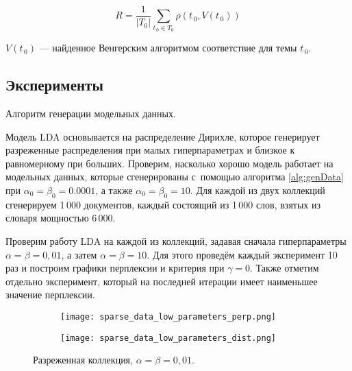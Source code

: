 \documentclass[12pt]{article}
\begin{document}
\[
R = \frac1{|T_0|} \sum_{t_{\,0}\in T_0} \rho(t_{\,0},V(t_{\,0}))
\]

$\displaystyle V(t_{\,0}) $ --- найденное Венгерским алгоритмом соответствие для темы $ t_{\,0} $.

\subsection{Эксперименты}

\begin{algorithm}
\label{alg:genData}
\caption{Алгоритм генерации модельных данных.}
\DontPrintSemicolon


\end{algorithm}

Модель LDA основывается на распределение Дирихле, которое генерирует разреженные распределения при малых гиперпараметрах и близкое к равномерному при больших.
Проверим, насколько хорошо модель работает на модельных данных, которые сгенерированы с~помощью алгоритма \ref{alg:genData} при $ \alpha_0 = \beta_0 = 0.0001 $, а также $ \alpha_0 = \beta_0 = 10 $.
Для каждой из двух коллекций сгенерируем 1\,000 документов, каждый состоящий из 1\,000 слов, взятых из словаря мощностью 6\,000.

Проверим работу LDA на каждой из коллекций, задавая сначала гиперпараметры $ \alpha = \beta = 0,01 $, а затем $ \alpha = \beta = 10 $.
Для этого проведём каждый эксперимент 10 раз и построим графики перплексии и критерия при $ \gamma = 0 $.
Также отметим отдельно эксперимент, который на последней итерации имеет наименьшее значение перплексии.

\begin{figure}[hbtp]
  \centering
  \begin{subfigure}[b]{0.49\textwidth}
    \centering
    \texttt{[image: sparse\_data\_low\_parameters\_perp.png]}
  \end{subfigure}
  \begin{subfigure}[b]{0.49\textwidth}
    \centering
    \texttt{[image: sparse\_data\_low\_parameters\_dist.png]}
  \end{subfigure}
  \caption{Разреженная коллекция, $ \alpha = \beta = 0,01 $.}
  \label{fig:sparse_data_low_parameters}
\end{figure}
\end{document}
